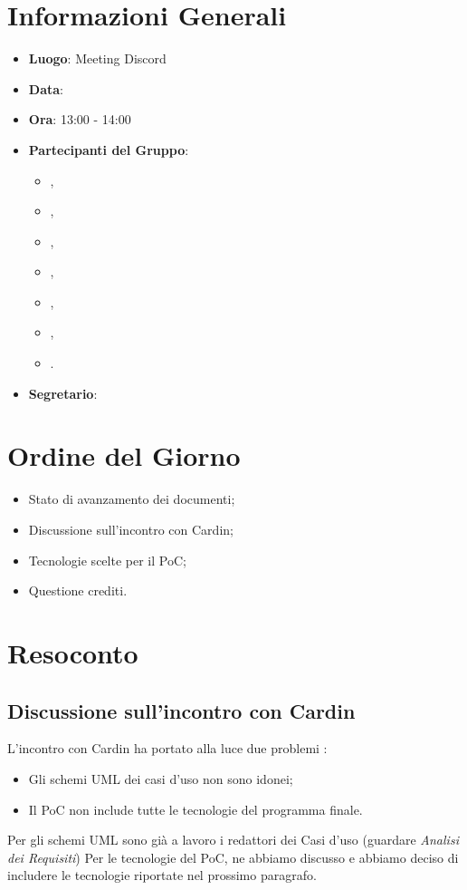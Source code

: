 \section{Informazioni Generali}

\begin{itemize}
\item{\textbf{Luogo}}: Meeting Discord
\item{\textbf{Data}}: \D{}
\item{\textbf{Ora}}: 13:00 - 14:00
\item{\textbf{Partecipanti del Gruppo}}: 
	\begin{itemize}
	\item{\EP{},} 
	\item{\FP{},}
	\item{\GC{},}
	\item{\LW{},}
	\item{\MB{},}
	\item{\MG{},}
	\item{\PV{}.}
	\end{itemize} 
\item{\textbf{Segretario}}: \PV{}	
\end{itemize}

\section{Ordine del Giorno}
\begin{itemize}
\item{Stato di avanzamento dei documenti;}
\item{Discussione sull'incontro con Cardin;}
\item{Tecnologie scelte per il PoC;}
\item{Questione crediti.}
\end{itemize}

\section{Resoconto}

\subsection{Discussione sull'incontro con Cardin}
L'incontro con Cardin ha portato alla luce due  problemi : 
\begin{itemize}
\item Gli schemi UML dei casi d'uso non sono idonei;
\item Il PoC non include tutte le tecnologie del programma finale. 
\end{itemize}
Per gli schemi UML sono già a lavoro i redattori dei Casi d'uso (guardare \textit{Analisi dei Requisiti})
Per le tecnologie del PoC, ne abbiamo discusso e abbiamo deciso di includere le tecnologie riportate nel prossimo paragrafo.

